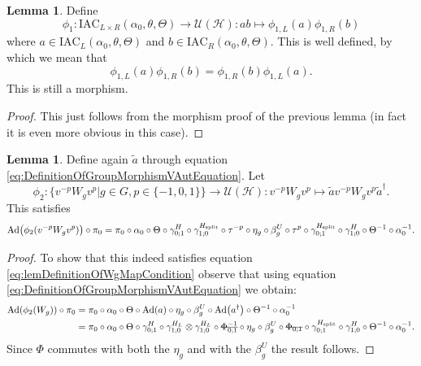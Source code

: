 \documentclass[12pt,a4paper,twoside]{article}
\newcommand{\stkout}[1]{\ifmmode\text{\sout{\ensuremath{#1}}}\else\sout{#1}\fi}
\newcommand{\IAC}{\textrm{IAC}}
\let\originalleft\left
\let\originalright\right
\renewcommand{\left}{\mathopen{}\mathclose\bgroup\originalleft}
\renewcommand{\right}{\aftergroup\egroup\originalright}
\newcommand{\UU}{\mathcal U}
\newcommand{\HH}{\mathcal H}
\newcommand{\Ad}[1]{\textrm{Ad}\left(#1\right)}
\theoremstyle{definition}
\newtheorem{lemma}[theorem]{Lemma}
\numberwithin{equation}{section}
\begin{document}
\begin{lemma}\label{lem:extensionOfPhi1Definition}
	Define
	\begin{equation}
		\phi_1:\IAC_{L\times R}(\alpha_0,\theta,\Theta)\rightarrow\UU(\HH):ab\mapsto \phi_{1,L}(a)\phi_{1,R}(b)
	\end{equation}
	where $a\in \IAC_{L}(\alpha_0,\theta,\Theta)$ and $b\in \IAC_{R}(\alpha_0,\theta,\Theta)$. This is well defined, by which we mean that
	\begin{equation}
		\phi_{1,L}(a)\phi_{1,R}(b)=\phi_{1,R}(b)\phi_{1,L}(a).
	\end{equation}
	This is still a morphism.
\end{lemma}
\begin{proof}
	This just follows from the morphism proof of the previous lemma (in fact it is even more obvious in this case).
\end{proof}
\begin{lemma}\label{lem:DefinitionOfWgMap}
	Define again $\tilde{a}$ through equation \eqref{eq:DefinitionOfGroupMorphismVAutEquation}. Let
	\begin{equation}
		\phi_2:\{v^{-p} W_g v^{p}|g\in G,p\in\{-1,0,1\}\}\rightarrow \UU(\HH):v^{-p} W_g v^{p}\mapsto \tilde{a}v^{-p} W_g v^{p}\tilde{a}^\dagger.
	\end{equation}
	This satisfies
	\begin{equation}\label{eq:lemDefinitionOfWgMapCondition}
		\Ad{\phi_2(v^{-p}W_g v^{p})}\circ\pi_0=\pi_0\circ \alpha_0\circ\Theta\circ\gamma^{H}_{0;1}\circ\gamma^{H_\text{split}}_{1;0}\circ\tau^{-p}\circ\eta_g\circ\beta_g^U\circ\tau^p\circ\gamma^{H_\text{split}}_{0;1}\circ\gamma^{H}_{1;0}\circ\Theta^{-1}\circ\alpha_0^{-1}.
	\end{equation}
\end{lemma}
\begin{proof}
	To show that this indeed satisfies equation \eqref{eq:lemDefinitionOfWgMapCondition} observe that using equation \eqref{eq:DefinitionOfGroupMorphismVAutEquation} we obtain:
	\begin{align}
		\Ad{\phi_2(W_g)}\circ\pi_0&=\pi_0\circ \alpha_0\circ\Theta\circ\Ad{a}\circ\eta_g\circ\beta_g^U\circ\Ad{a^{\dagger}}\circ\Theta^{-1}\circ\alpha_0^{-1}\\
		&=\pi_0\circ \alpha_0\circ\Theta\circ\gamma^H_{0;1}\circ\gamma^{H_L}_{1;0}\otimes\gamma^{H_L}_{1;0}\circ\stkout{\Phi_{0;1}^{-1}}\circ\eta_g\circ\beta_g^U\circ\stkout{\Phi_{0;1}}\circ\gamma^{H_\text{split}}_{0;1}\circ\gamma^H_{1;0}\circ\Theta^{-1}\circ\alpha_0^{-1}.
	\end{align}
	Since $\Phi$ commutes with both the $\eta_g$ and with the $\beta_g^U$ the result follows.
\end{proof}
\end{document}
